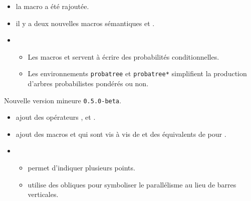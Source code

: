 \documentclass[12pt,a4paper]{book}
\begin{document}
\begin{description}
\begin{itemize}[itemsep=.5em]
    \item {}
          la macro  a été rajoutée.




    \item {}
          il y a deux nouvelles macros sémantiques  et .




    \item {}
    \begin{itemize}[itemsep=.5em]
        \item Les macros  et  servent à écrire des probabilités conditionnelles.

        \item Les environnements \verb+probatree+ et \verb+probatree*+ simplifient la production d'arbres probabilistes pondérés ou non.
    \end{itemize}
\end{itemize}

\end{description}\begin{description}
\medskip
\item[2019-09-27] Nouvelle version mineure \verb+0.5.0-beta+.

\begin{itemize}[itemsep=.5em]
    \item {}
          ajout des opérateurs ,  et .




    \item {}
           ajout des macros  et  qui sont vis à vis de  et  des équivalents de  pour .




    \item {}
    \begin{itemize}[itemsep=.5em]
        \item {} permet d'indiquer plusieurs points.

        \item {} utilise des obliques pour symboliser le parallélisme au lieu de barres verticales.
    \end{itemize}



\end{itemize}
\end{description}
\end{document}
